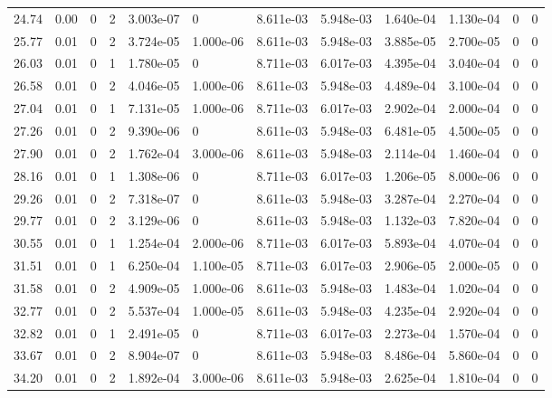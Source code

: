 \documentclass[preview]{standalone}
\begin{document}
{{{\begin{tabular}{L{1.2cm}C{1.2cm} C{0.3cm}C{0.5cm} C{1.4cm}C{1.4cm} C{1.4cm}C{1.4cm} C{1.6cm}C{1.6cm} C{1.6cm}C{1.6cm}}
  24.74  &  0.00  & 0     &  2 &  3.003e-07  & 0  &  8.611e-03&   5.948e-03& 1.640e-04 & 1.130e-04   &  0 & 0  \\ 
  25.77  &  0.01  & 0     &  2 &  3.724e-05  & 1.000e-06  &  8.611e-03&   5.948e-03& 3.885e-05 & 2.700e-05   &  0 & 0  \\ 
  26.03  &  0.01  & 0     &  1 &  1.780e-05  & 0  &  8.711e-03&   6.017e-03& 4.395e-04 & 3.040e-04   &  0 & 0  \\ 
  26.58  &  0.01  & 0     &  2 &  4.046e-05  & 1.000e-06  &  8.611e-03&   5.948e-03& 4.489e-04 & 3.100e-04   &  0 & 0  \\ 
  27.04  &  0.01  & 0     &  1 &  7.131e-05  & 1.000e-06  &  8.711e-03&   6.017e-03& 2.902e-04 & 2.000e-04   &  0 & 0  \\ 
  27.26  &  0.01  & 0     &  2 &  9.390e-06  & 0  &  8.611e-03&   5.948e-03& 6.481e-05 & 4.500e-05   &  0 & 0  \\ 
  27.90  &  0.01  & 0     &  2 &  1.762e-04  & 3.000e-06  &  8.611e-03&   5.948e-03& 2.114e-04 & 1.460e-04   &  0 & 0  \\ 
  28.16  &  0.01  & 0     &  1 &  1.308e-06  & 0  &  8.711e-03&   6.017e-03& 1.206e-05 & 8.000e-06   &  0 & 0  \\ 
  29.26  &  0.01  & 0     &  2 &  7.318e-07  & 0  &  8.611e-03&   5.948e-03& 3.287e-04 & 2.270e-04   &  0 & 0  \\ 
  29.77  &  0.01  & 0     &  2 &  3.129e-06  & 0  &  8.611e-03&   5.948e-03& 1.132e-03 & 7.820e-04   &  0 & 0  \\ 
  30.55  &  0.01  & 0     &  1 &  1.254e-04  & 2.000e-06  &  8.711e-03&   6.017e-03& 5.893e-04 & 4.070e-04   &  0 & 0  \\ 
  31.51  &  0.01  & 0     &  1 &  6.250e-04  & 1.100e-05  &  8.711e-03&   6.017e-03& 2.906e-05 & 2.000e-05   &  0 & 0  \\ 
  31.58  &  0.01  & 0     &  2 &  4.909e-05  & 1.000e-06  &  8.611e-03&   5.948e-03& 1.483e-04 & 1.020e-04   &  0 & 0  \\ 
  32.77  &  0.01  & 0     &  2 &  5.537e-04  & 1.000e-05  &  8.611e-03&   5.948e-03& 4.235e-04 & 2.920e-04   &  0 & 0  \\ 
  32.82  &  0.01  & 0     &  1 &  2.491e-05  & 0  &  8.711e-03&   6.017e-03& 2.273e-04 & 1.570e-04   &  0 & 0  \\ 
  33.67  &  0.01  & 0     &  2 &  8.904e-07  & 0  &  8.611e-03&   5.948e-03& 8.486e-04 & 5.860e-04   &  0 & 0  \\ 
  34.20  &  0.01  & 0     &  2 &  1.892e-04  & 3.000e-06  &  8.611e-03&   5.948e-03& 2.625e-04 & 1.810e-04   &  0 & 0  \\ 

\end{tabular}}}}
\end{document}
